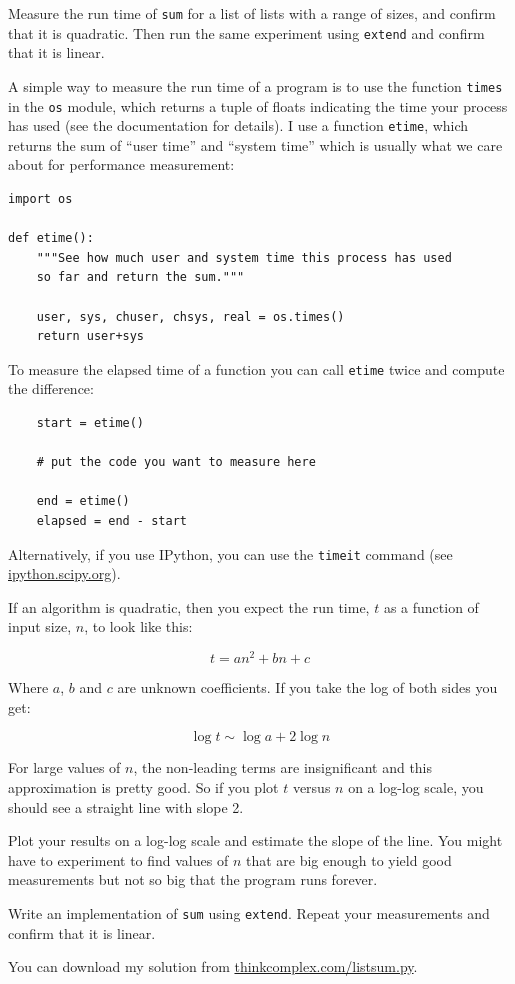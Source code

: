 \documentclass[10pt]{book}
\begin{document}
\begin{ex}
\label{listsum}

Measure the run time of {\tt sum} for a list of lists with a range
of sizes, and confirm that it is quadratic.  Then run the same
experiment using {\tt extend} and confirm that it is linear.

A simple way to measure the run time of a program is to use
the function {\tt times} in the {\tt os} module, which returns
a tuple of floats indicating the time your process has used
(see the documentation for details).  I use a function {\tt etime},
which returns the sum of ``user time'' and ``system time'' which
is usually what we care about for performance measurement:

\begin{verbatim}
import os

def etime():
    """See how much user and system time this process has used
    so far and return the sum."""

    user, sys, chuser, chsys, real = os.times()
    return user+sys
\end{verbatim}

To measure the elapsed time of a function you can call
{\tt etime} twice and compute the difference:

\begin{verbatim}
    start = etime()

    # put the code you want to measure here

    end = etime()
    elapsed = end - start
\end{verbatim}

Alternatively, if you use IPython, you can use the
{\tt timeit} command (see \url{ipython.scipy.org}).

If an algorithm is quadratic, then you expect the run time, $t$
as a function of input size, $n$, to look like this:

\[ t = a n^2 + b n + c \]

Where $a$, $b$ and $c$ are unknown coefficients.  If you take
the log of both sides you get:

\[ \log t \sim \log a + 2 \log n \]

For large values of $n$, the non-leading terms are insignificant
and this approximation is pretty good.  So if you plot $t$
versus $n$ on a log-log scale, you should see a straight line
with slope 2.  

Plot your results on a log-log scale and estimate the slope
of the line.  You might have to experiment to find values of
$n$ that are big enough to yield good measurements but not so
big that the program runs forever.

Write an implementation of {\tt sum} using {\tt extend}.
Repeat your measurements and confirm that it is linear.

You can download my solution from
\url{thinkcomplex.com/listsum.py}.

\end{ex}
\end{document}
